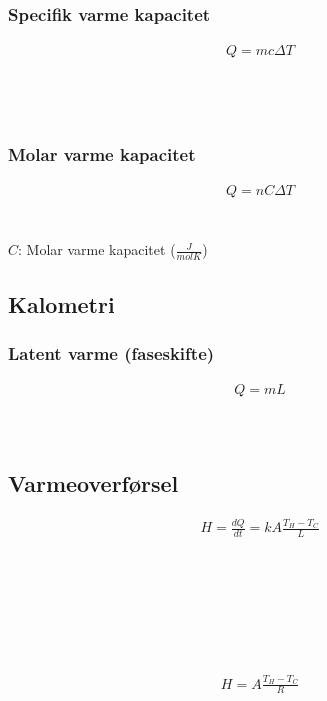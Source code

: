 	\subsubsection{Specifik varme kapacitet}
		\begin{align}
			Q=mc\Delta T
		\end{align}
		\varme\\
		\masse\\
		\secvarmcap\\
		\tempk
	
	\subsubsection{Molar varme kapacitet}
		\begin{align}
			Q=nC\Delta T
		\end{align}
		\varme\\
		\mol\\
		$C$: Molar varme kapacitet ($\frac{J}{mol K}$)\\
		\tempk

\subsection{Kalometri}
	\subsubsection{Latent varme (faseskifte)}
		\begin{align}
			Q=mL
		\end{align}
		\varme\\
		\masse\\
		\latent

\subsection{Varmeoverførsel}
	\begin{align}
		H=\frac{dQ}{dt}=kA\frac{T_H-T_C}{L}
	\end{align}
	\varmehast\\
	\varme\\
	\termkond\\
	\areal\\
	\tempV\\
	\tempK\\
	\lengde

	\begin{align}
		H=A\frac{T_H-T_C}{R}
	\end{align}
	\varmehast\\
	\areal\\
	\tempV\\
	\tempK\\
	\termmod

